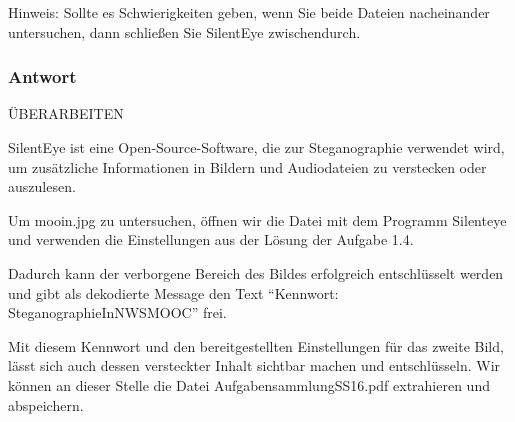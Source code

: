 \documentclass{article}
\begin{document}
Hinweis: Sollte es Schwierigkeiten geben, wenn Sie beide Dateien nacheinander 
untersuchen, dann schließen Sie SilentEye zwischendurch.

\subsubsection*{Antwort}

ÜBERARBEITEN

SilentEye ist eine Open-Source-Software, die zur Steganographie verwendet wird, um 
zusätzliche Informationen in Bildern und Audiodateien zu verstecken oder auszulesen. 

Um mooin.jpg zu untersuchen, öffnen wir die Datei mit dem Programm Silenteye und 
verwenden die Einstellungen aus der Lösung der Aufgabe 1.4.

Dadurch kann der verborgene Bereich des Bildes erfolgreich entschlüsselt werden und 
gibt als dekodierte Message den Text ``Kennwort: SteganographieInNWSMOOC'' frei.

Mit diesem Kennwort und den bereitgestellten Einstellungen für das zweite Bild, lässt 
sich auch dessen versteckter Inhalt sichtbar machen und entschlüsseln. Wir können an 
dieser Stelle die Datei AufgabensammlungSS16.pdf extrahieren und abspeichern.
\end{document}
